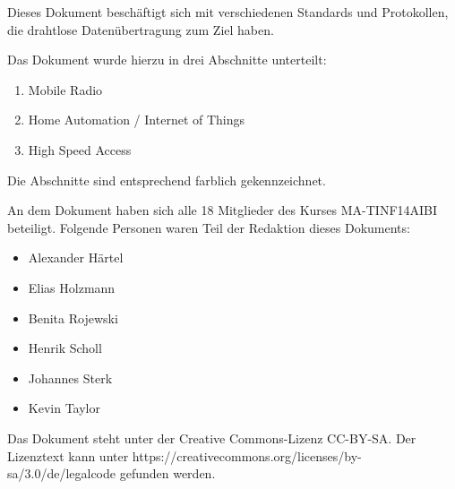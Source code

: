 \begin{minipage}{2.5cm}\hspace{2cm}\end{minipage}\begin{minipage}{14.5cm}
\vspace{15cm}
Dieses Dokument beschäftigt sich mit verschiedenen Standards und Protokollen, die drahtlose Datenübertragung zum Ziel haben.

Das Dokument wurde hierzu in drei Abschnitte unterteilt:
\begin{enumerate}
\item \textcolor{mobile}{Mobile Radio}
\item \textcolor{iot}{Home Automation / Internet of Things}
\item \textcolor{access}{High Speed Access}
\end{enumerate}
Die Abschnitte sind entsprechend farblich gekennzeichnet.

An dem Dokument haben sich alle 18 Mitglieder des Kurses MA-TINF14AIBI beteiligt. Folgende Personen waren Teil der Redaktion dieses Dokuments:
\begin{itemize}
\item Alexander Härtel
\item Elias Holzmann
\item Benita Rojewski
\item Henrik Scholl
\item Johannes Sterk
\item Kevin Taylor
\end{itemize}

Das Dokument steht unter der Creative Commons-Lizenz CC-BY-SA. Der Lizenztext kann unter https://creativecommons.org/licenses/by-sa/3.0/de/legalcode gefunden werden.
\end{minipage}

